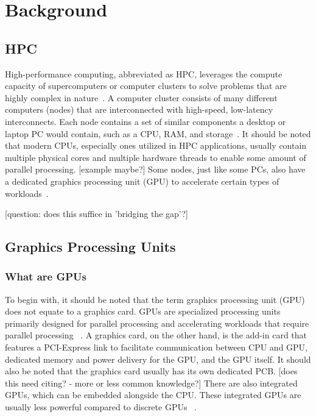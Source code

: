 
\chapter{Background}\label{chapter:Background}

\section{HPC}

High-performance computing, abbreviated as HPC, leverages the compute capacity of supercomputers or computer clusters to solve problems that are highly complex in nature~\cite{ibm_what_2022}. A computer cluster consists of many different computers (nodes) that are interconnected with high-speed, low-latency interconnects. Each node contains a set of similar components a desktop or laptop PC would contain, such as a CPU, RAM, and storage~\cite{iowa_state_university_what_2020}. It should be noted that modern CPUs, especially ones utilized in HPC applications, usually contain multiple physical cores and multiple hardware threads to enable some amount of parallel processing. [example maybe?] Some nodes, just like some PCs, also have a dedicated graphics processing unit (GPU) to accelerate certain types of workloads~\cite{iowa_state_university_what_2020}.
 
  
 [question: does this suffice in 'bridging the gap'?]
 
 
 \section{Graphics Processing Units}
 
 
 \subsection{What are GPUs}
 To begin with, it should be noted that the term graphics processing unit (GPU) does not equate to a graphics card. GPUs are specialized processing units primarily designed for parallel processing and accelerating workloads that require parallel processing ~\cite{intel_what_2022}. A graphics card, on the other hand, is the add-in card that features a PCI-Express link to facilitate communication between CPU and GPU, dedicated memory and power delivery for the GPU, and the GPU itself. It should also be noted that the graphics card usually has its own dedicated PCB. [does this need citing? - more or less common knowledge?] There are also integrated GPUs, which can be embedded alongside the CPU.  These integrated GPUs are usually less powerful compared to discrete GPUs ~\cite{intel_what_2022}.

